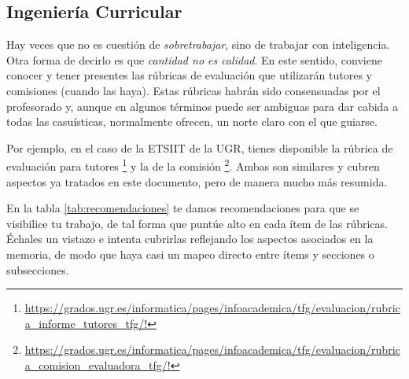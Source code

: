 \subsection{Ingeniería Curricular} 

Hay veces que no es cuestión de \textit{sobretrabajar}, sino de trabajar con inteligencia. Otra forma de decirlo es que {\it cantidad no es calidad}. En este sentido, conviene conocer y tener presentes las rúbricas de evaluación que utilizarán tutores y comisiones (cuando las haya). Estas rúbricas habrán sido consensuadas por el profesorado y, aunque en algunos términos puede ser ambiguas para dar cabida a todas las casuísticas, normalmente ofrecen, un norte claro con el que guiarse.  

Por ejemplo, en el caso de la ETSIIT de la UGR, tienes disponible la rúbrica de evaluación para tutores   \footnote{\url{https://grados.ugr.es/informatica/pages/infoacademica/tfg/evaluacion/rubrica_informe_tutores_tfg/!}} y la de la comisión \footnote{\url{https://grados.ugr.es/informatica/pages/infoacademica/tfg/evaluacion/rubrica_comision_evaluadora_tfg/!}}. Ambas son similares y cubren aspectos ya tratados en este documento, pero de manera mucho más resumida.

En la tabla \ref{tab:recomendaciones} te damos recomendaciones para que se visibilice tu trabajo, de tal forma que puntúe alto en cada ítem de las rúbricas. Échales un vistazo e intenta cubrirlas reflejando los aspectos asociados en la memoria, de modo que haya casi un mapeo directo entre ítems y secciones o subsecciones.

